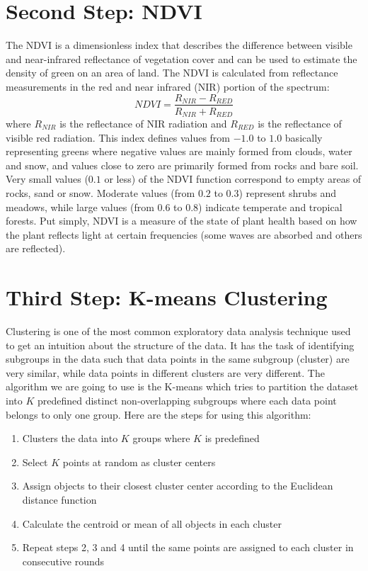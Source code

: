 \documentclass[a4paper,11pt,oneside]{book}
\begin{document}
\section*{Second Step: NDVI}
The NDVI is a dimensionless index that describes the difference between visible and near-infrared reflectance of vegetation cover and can be used to estimate the density of green on an area of land.
The NDVI is calculated from reflectance measurements in the red and near infrared (NIR) portion of the spectrum:
\begin{equation}
NDVI = \dfrac{R_{NIR} - R_{RED}}{R_{NIR} + R_{RED}}
\end{equation}
where $R_{NIR}$ is the reflectance of NIR radiation and $R_{RED}$ is the reflectance of visible red radiation.
This index defines values from $-1.0$ to $1.0$ basically representing greens where negative values are mainly formed from clouds, water and snow, and values close to zero are primarily formed from rocks and bare soil. Very small values ($0.1$ or less) of the NDVI function correspond to empty areas of rocks, sand or snow. Moderate values (from $0.2$ to $0.3$) represent shrubs and meadows, while large values (from $0.6$ to $0.8$) indicate temperate and tropical forests. 
Put simply, NDVI is a measure of the state of plant health based on how the plant reflects light at certain frequencies (some waves are absorbed and others are reflected).

\section*{Third Step: K-means Clustering}
Clustering is one of the most common exploratory data analysis technique used to get an intuition about the structure of the data. It has the task of identifying subgroups in the data such that data points in the same subgroup (cluster) are very similar, while data points in different clusters are very different.
The algorithm we are going to use is the K-means which tries to partition the dataset into $K$ predefined distinct non-overlapping subgroups where each data point belongs to only one group.
Here are the steps for using this algorithm:
\begin{enumerate}
\item Clusters the data into $K$ groups where $K$  is predefined
\item Select $K$ points at random as cluster centers
\item Assign objects to their closest cluster center according to the Euclidean distance function
\item Calculate the centroid or mean of all objects in each cluster
\item Repeat steps 2, 3 and 4 until the same points are assigned to each cluster in consecutive rounds
\end{enumerate}
\newpage
\end{document}
